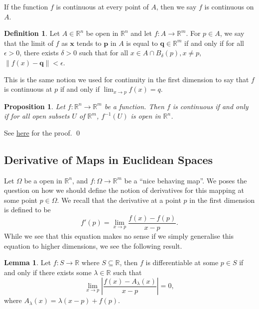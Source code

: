 \documentclass[
]{article}
\newtheorem{prop}{Proposition}
\theoremstyle{definition}
\newtheorem{definition}{Definition}[section]
\newtheorem{lemma}{Lemma}[section]
\begin{document}
If the function \(f\) is continuous at every point of \(A\), then we say
\(f\) is continuous on \(A\).

\begin{definition}
  Let \(A \in \mathbb{R}^n\) be open in \(\mathbb{R}^n\) and let 
  \(f : A \to \mathbb{R}^m\). For \(p \in A\), we say that the limit of \(f\) as 
  \(\mathbf{x}\) tends to \(\mathbf{p}\) in \(A\) is equal to 
  \(\mathbf{q} \in \mathbb{R}^m\) if and only if for all \(\epsilon > 0\), there 
  exists \(\delta > 0\) such that for all \(x \in A \cap B_\delta(p), x \neq p\),
  \(\|f(x) - \mathbf{q}\| < \epsilon\).
\end{definition}

This is the same notion we used for continuity in the first dimension to
say that \(f\) is continuous at \(p\) if and only if
\(\lim_{x \to p} f(x) = q\).

\begin{prop}
  Let \(f : \mathbb{R}^n \to \mathbb{R}^m\) be a function. Then \(f\) is 
  continuous if and only if for all open subsets \(U\) of \(\mathbb{R}^m\), 
  \(f^{-1}(U)\) is open in \(\mathbb{R}^n\).
\end{prop}
\proof

See
\href{https://github.com/JasonKYi/learn_mspaces/blob/master/src/metric_spaces/basic.lean\#L257}{here}
for the proof. \qed

\hypertarget{derivative-of-maps-in-euclidean-spaces}{%
\subsection{Derivative of Maps in Euclidean
Spaces}\label{derivative-of-maps-in-euclidean-spaces}}

Let \(\Omega\) be a open in \(\mathbb{R}^n\), and
\(f : \Omega \to \mathbb{R}^m\) be a ``nice behaving map''. We poses the
question on how we should define the notion of derivatives for this
mapping at some point \(p \in \Omega\). We recall that the derivative at
a point \(p\) in the first dimension is defined to be
\[f'(p) = \lim_{x \to p}\frac{f(x) - f(p)}{x - p}.\] While we see that
this equation makes no sense if we simply generalise this equation to
higher dimensions, we see the following result.

\begin{lemma}
  Let \(f : S \to \mathbb{R}\) where \(S \subseteq \mathbb{R}\), then \(f\) is 
  differentiable at some \(p \in S\) if and only if there exists some 
  \(\lambda \in \mathbb{R}\) such that 
  \[\lim_{x \to p} \left|\frac{f(x) - A_\lambda(x)}{x - p}\right| = 0,\]
  where \(A_\lambda(x) = \lambda(x - p) + f(p)\).
\end{lemma}
\proof
\end{document}
